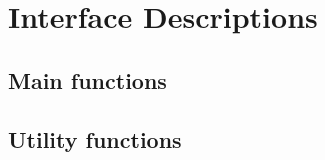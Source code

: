 \chapter{Interface Descriptions}


\section{Main functions}
\newpage
\newpage
\newpage
\newpage
\newpage
\newpage


\section{Utility functions}









